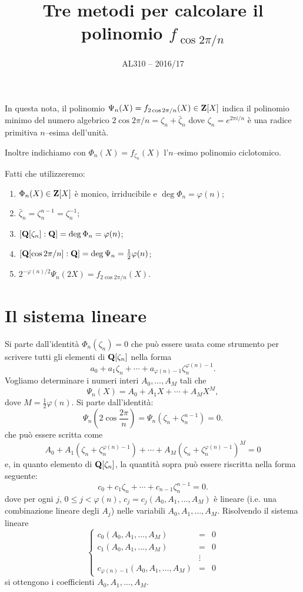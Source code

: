 \documentclass[a4paper,10pt]{article}
\title{Tre metodi per calcolare il polinomio $f_{\cos 2\pi/n}$}
\author{AL310 -- 2016/17}
\begin{document}
\maketitle

In questa nota, il polinomio $\Psi_n(X)=f_{2\cos 2\pi/n}(X)\in{\bf Z}[X]$ indica il polinomio minimo del
numero algebrico $2\cos2\pi/n=\zeta_n+\bar\zeta_n$ dove $\zeta_n=e^{2\pi i/n}$
è una radice primitiva $n$--esima dell'unità.

Inoltre indichiamo con $\Phi_n(X)=f_{\zeta_n}(X)$ l'$n$--esimo polinomio ciclotomico.

Fatti che utilizzeremo:
\begin{enumerate}
 \item  $\Phi_n(X)\in{\bf Z}[X]$ è monico, irriducibile e $\deg\Phi_n=\varphi(n)$;
 \item $\bar\zeta_n=\zeta_n^{n-1}=\zeta_n^{-1}$;
 \item $[{\bf Q}[\zeta_n]:{\bf Q}]=\deg\Phi_n=\varphi(n)$;
 \item $[{\bf Q}[\cos 2\pi/n]:{\bf Q}]=\deg\Psi_{n} =\frac12\varphi(n)$;
\item $2^{-\varphi(n)/2}\Psi_n(2X)=f_{2\cos 2\pi/n}(X).$
\end{enumerate}



\section{Il sistema lineare} 
Si parte dall'identità $\Phi_n(\zeta_n)=0$
che può essere usata come strumento per scrivere tutti gli elementi di ${\bf Q}[\zeta_n]$ nella forma
$$a_0+a_1\zeta_n+\cdots+a_{\varphi(n)-1}\zeta_n^{\varphi(n)-1}.$$
Vogliamo determinare i numeri interi $A_0,\ldots,A_M$ tali che 
$$\Psi_n(X)=A_0+A_1X+\cdots+A_{M}X^M,$$
dove $M=\frac12\varphi(n)$.
Si parte dall'identità:
$$\Psi_n(2\cos \frac{2\pi}n)=\Psi_n\left(\zeta_n+\zeta_n^{n-1}\right)=0.$$
che può essere scritta come
$$A_0+A_1\left(\zeta_n+\zeta_n^{\varphi(n)-1}\right)+\cdots+A_{M}\left(\zeta_n+\zeta_n^{\varphi(n)-1}\right)^M=0$$
e, in quanto elemento di ${\bf Q}[\zeta_n]$, la quantità sopra può essere riscritta nella forma seguente:
$$c_0+c_1\zeta_n+\cdots+c_{n-1}\zeta_n^{n-1}=0.$$
dove per ogni $j$, $0\le j<\varphi(n)$, $c_j=c_j(A_0,A_1,\ldots,A_M)$ è lineare (i.e. una combinazione lineare degli $A_j$) nelle variabili
$A_0,A_1,\ldots,A_M$. Risolvendo il sistema lineare
$$\left\{\begin{array}{rcl}
          c_0(A_0,A_1,\ldots,A_M)& =&0\\
c_1(A_0,A_1,\ldots,A_M)&=&0\\
&\vdots&\\
c_{\varphi(n)-1}(A_0,A_1,\ldots,A_M)&=&0
           \end{array}\right.$$
  si ottengono i coefficienti $A_0,A_1,\ldots,A_M$.\medskip
  
\end{document}
